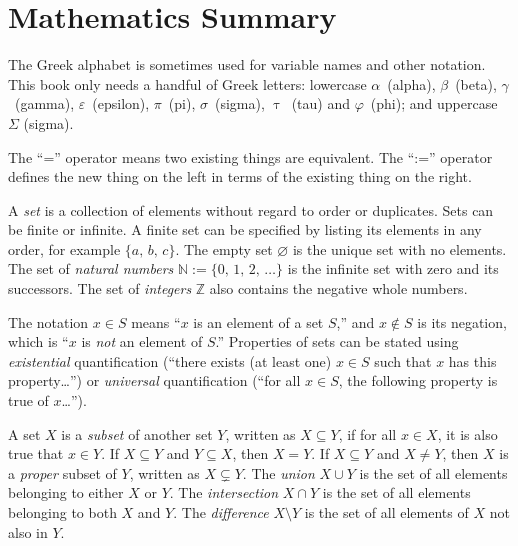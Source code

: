 \documentclass[../generics]{subfiles}
\begin{document}
\chapter{Mathematics Summary}\label{math summary}

The Greek alphabet is sometimes used for variable names and other notation. This book only needs a handful of Greek letters: lowercase $\alpha$~(alpha), $\beta$~(beta), $\gamma$~(gamma), $\varepsilon$~(epsilon), $\pi$~(pi), $\sigma$~(sigma), $\uptau$~(tau) and $\varphi$~(phi); and uppercase $\Sigma$ (sigma).

The ``='' operator means two existing things are equivalent. The ``:='' operator defines the new thing on the left in terms of the existing thing on the right.

A \emph{set} is a collection of elements without regard to order or duplicates. Sets can be finite or infinite. A finite set can be specified by listing its elements in any order, for example $\{a,\,b,\,c\}$. The empty set \index{$\varnothing$}$\varnothing$ is the unique set with no elements. The set of \emph{natural numbers} $\mathbb{N}:=\{0,\,1,\,2,\,\ldots\}$ is the infinite set with zero and its successors. The set of \emph{integers} $\mathbb{Z}$ also contains the negative whole numbers.

The notation \index{$\in$}$x\in S$ means ``$x$ is an element of a set $S$,'' and \index{$\notin$}$x\notin S$ is its negation, which is ``$x$ is \emph{not} an element of $S$.'' Properties of sets can be stated using \emph{existential} quantification (``there exists (at least one) $x\in S$ such that $x$ has this property\ldots'') or \emph{universal} quantification (``for all $x\in S$, the following property is true of $x$\ldots'').

%
%
A set $X$ is a \emph{subset} of another set $Y$, written as \index{$\subseteq$}$X\subseteq Y$, if for all $x\in X$, it is also true that $x\in Y$. If $X\subseteq Y$ and $Y\subseteq X$, then $X=Y$. If $X\subseteq Y$ and $X\neq Y$, then $X$ is a \emph{proper} subset of $Y$, written as \index{$\subsetneq$}$X\subsetneq Y$. The \emph{union} \index{$\cup$}$X\cup Y$ is the set of all elements belonging to either $X$ or $Y$. The \emph{intersection} \index{$\cap$}$X\cap Y$ is the set of all elements belonging to both $X$ and $Y$. The \emph{difference} \index{$\setminus$}$X\setminus Y$ is the set of all elements of $X$ not also in $Y$.
\end{document}

